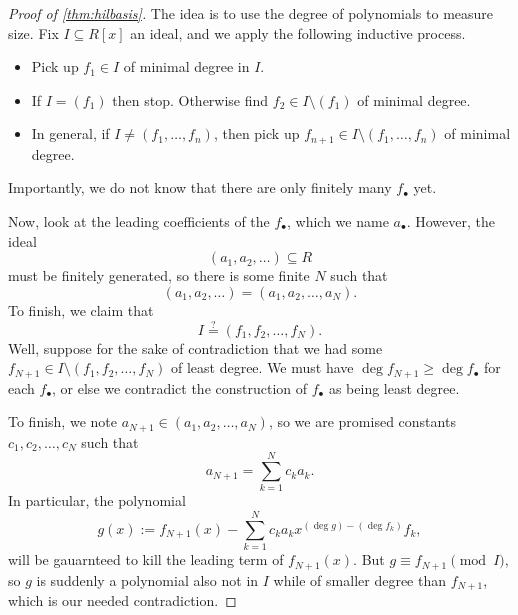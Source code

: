 \begin{proof}[Proof of \autoref{thm:hilbasis}]
	The idea is to use the degree of polynomials to measure size. Fix $I\subseteq R[x]$ an ideal, and we apply the following inductive process.
	\begin{itemize}
		\item Pick up $f_1\in I$ of minimal degree in $I$.
		\item If $I=(f_1)$ then stop. Otherwise find $f_2\in I\setminus(f_1)$ of minimal degree.
		\item In general, if $I\ne(f_1,\ldots,f_n)$, then pick up $f_{n+1}\in I\setminus(f_1,\ldots,f_n)$ of minimal degree.
	\end{itemize}
	Importantly, we do not know that there are only finitely many $f_\bullet$ yet.

	Now, look at the leading coefficients of the $f_\bullet$, which we name $a_\bullet$. However, the ideal
	\[(a_1,a_2,\ldots)\subseteq R\]
	must be finitely generated, so there is some finite $N$ such that
	\[(a_1,a_2,\ldots)=(a_1,a_2,\ldots,a_N).\]
	To finish, we claim that
	\[I\stackrel?=(f_1,f_2,\ldots,f_N).\]
	Well, suppose for the sake of contradiction that we had some $f_{N+1}\in I\setminus(f_1,f_2,\ldots,f_N)$ of least degree. We must have $\deg f_{N+1}\ge\deg f_\bullet$ for each $f_\bullet$, or else we contradict the construction of $f_\bullet$ as being least degree.

	To finish, we note $a_{N+1}\in(a_1,a_2,\ldots,a_N)$, so we are promised constants $c_1,c_2,\ldots,c_N$ such that
	\[a_{N+1}=\sum_{k=1}^Nc_ka_k.\]
	In particular, the polynomial
	\[g(x):=f_{N+1}(x)-\sum_{k=1}^Nc_ka_kx^{(\deg g)-(\deg f_k)}f_k,\]
	will be gauarnteed to kill the leading term of $f_{N+1}(x)$. But $g\equiv f_{N+1}\pmod I$, so $g$ is suddenly a polynomial also not in $I$ while of smaller degree than $f_{N+1}$, which is our needed contradiction.
\end{proof}

